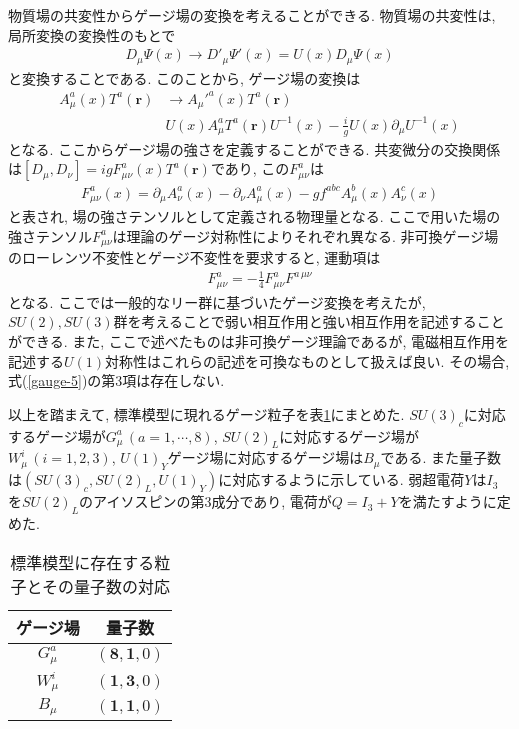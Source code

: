 物質場の共変性からゲージ場の変換を考えることができる.
物質場の共変性は, 局所変換の変換性のもとで
\begin{align}
  D_\mu\Psi(x) \rightarrow D'_\mu \Psi'(x) = U(x) D_\mu \Psi(x)\label{gauge-3}
\end{align}
と変換することである.
このことから, ゲージ場の変換は
\begin{align}
   A_\mu^a(x) T^a(\bm{r}) &\rightarrow A_\mu'^a(x) T^a(\bm{r})\nonumber\\
                          & U(x)A_\mu^a T^a(\bm{r}) U^{-1}(x) -\frac{i}{g}U(x)\partial_\mu U^{-1}(x) \label{gauge-4}
\end{align}
となる.
ここからゲージ場の強さを定義することができる.
共変微分の交換関係は$[D_\mu,D_\nu] = igF_{\mu\nu}^a(x)T^a(\bm{r})$であり, この$F_{\mu\nu}^a$は
\begin{align}
  F_{\mu\nu}^a(x) = \partial_\mu A_\nu^a(x) - \partial_\nu A_\mu^a(x) - gf^{abc}A_\mu^b(x)A_\nu^c(x)\label{gauge-5}
\end{align}
と表され, 場の強さテンソルとして定義される物理量となる.
ここで用いた場の強さテンソル$F_{\mu\nu}^a$は理論のゲージ対称性によりそれぞれ異なる.
非可換ゲージ場のローレンツ不変性とゲージ不変性を要求すると, 運動項は
\begin{align}
  F_{\mu\nu}^a = -\frac{1}{4}F_{\mu\nu}^a F^{a\,\mu\nu}\label{gauge-6}
\end{align}
となる.
ここでは一般的なリー群に基づいたゲージ変換を考えたが, $SU(2), SU(3)$群を考えることで弱い相互作用と強い相互作用を記述することができる.
また, ここで述べたものは非可換ゲージ理論であるが, 電磁相互作用を記述する$U(1)$対称性はこれらの記述を可換なものとして扱えば良い.
その場合, 式(\ref{gauge-5})の第3項は存在しない. 

以上を踏まえて, 標準模型に現れるゲージ粒子を表\ref{table:Gauge_particle}にまとめた.
$SU(3)_c$に対応するゲージ場が$G_\mu^a\,(a=1,\cdots,8)$, $SU(2)_L$に対応するゲージ場が$W_\mu^i\,(i=1,2,3)$, $U(1)_Y$ゲージ場に対応するゲージ場は$B_\mu$である.
また量子数は$\left(SU(3)_c, SU(2)_L, U(1)_Y\right)$に対応するように示している.
弱超電荷$Y$は$I_3$を$SU(2)_L$のアイソスピンの第3成分であり, 電荷が$Q=I_3+Y$を満たすように定めた. 
\begin{table}[ht]
  \centering
  \begin{tabular}{cc}\hline
    ゲージ場 & 量子数\\\hline\hline
    $G_\mu^a $ & $(\bm{8}, \bm{1}, 0 )$ \\
    $W_\mu^i $ & $(\bm{1}, \bm{3}, 0 )$ \\
    $B_\mu   $ & $(\bm{1}, \bm{1}, 0 )$\\\hline
  \end{tabular}
  \label{table:Gauge_particle}
  \caption{標準模型に存在する粒子とその量子数の対応}
\end{table}
